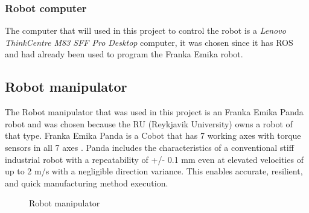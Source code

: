 \subsubsection*{Robot computer}
The computer that will used in this project to control the robot is a \textit{Lenovo ThinkCentre M83 SFF Pro Desktop}\cite{noauthor_thinkcentre_nodate} computer, it was chosen since it has ROS and had already been used to program the Franka Emika robot. 

\clearpage

\subsection{Robot manipulator\label{subsec:robot}}
The Robot manipulator that was used in this project is an Franka Emika Panda robot and was chosen because the RU (Reykjavik University) owns a robot of that type. Franka Emika Panda is a Cobot that has 7 working axes with torque sensors in all 7 axes \cite{gmbh_franka_nodate}. Panda includes the characteristics of a conventional stiff industrial robot with a repeatability of +/- 0.1 mm even at elevated velocities of up to 2 m/s with a negligible direction variance. This enables accurate, resilient, and quick manufacturing method execution. 
\begin{figure}[h]
    \centering
    \hfill
    \caption{Robot manipulator}
    \label{figure: frankaemika}
\end{figure}
